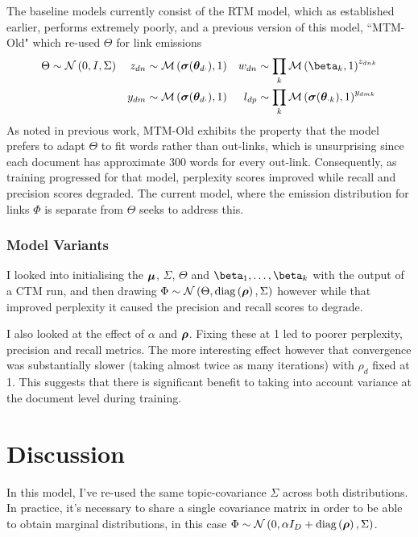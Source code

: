 The baseline models currently consist of the RTM model, which as established earlier, performs extremely poorly, and a previous version of this model, ``MTM-Old" which re-used $\Theta$ for link emissions
\begin{align}
\Theta & \sim \mnor{0}{I}{\Sigma} &
z_{dn} & \sim \muln{\vv{\sigma}(\thdo)}{1} &
w_{dn} & \sim \prod_k \muln{\vv{\beta}_k}{1}^{z_{dnk}} \\
& &
y_{dm} & \sim \muln{\vv{\sigma}(\thdo)}{1} &
l_{dp} & \sim \prod_k \muln{\vv{\sigma}(\thok)}{1}^{y_{dmk}}
\end{align}
As noted in previous work, MTM-Old exhibits the property that the model prefers to adapt $\Theta$ to fit words rather than out-links, which is unsurprising since each document has approximate 300 words for every out-link. Consequently, as training progressed for that model, perplexity scores improved while recall and precision scores degraded. The current model, where the emission distribution for links $\Phi$ is separate from $\Theta$ seeks to address this.

\subsubsection*{Model Variants}
I looked into initialising the $\bm \mu$, $\Sigma$, $\Theta$ and $\vv{\beta}_1, \ldots, \vv{\beta}_k$ with the output of a CTM run, and then drawing $\Phi \sim \mathcal{N} \left(\Theta, \text{diag} \left( {\bm \rho} \right), \Sigma\right)$ however while that improved perplexity it caused the precision and recall scores to degrade.

I also looked at the effect of $\alpha$ and $\bm \rho$. Fixing these at 1 led to poorer perplexity, precision and recall metrics. The more interesting effect however that convergence was substantially slower (taking almost twice as many iterations) with $\rho_d$ fixed at 1. This suggests that there is significant benefit to taking into account variance at the document level during training.

\section{Discussion}
In this model, I've re-used the same topic-covariance $\Sigma$ across both distributions. In practice, it's necessary to share a single covariance matrix in order to be able to obtain marginal distributions, in this case $\Phi \sim \mathcal{N} \left(0, \alpha I_D + \text{diag} \left( {\bm \rho} \right), \Sigma\right)$.

